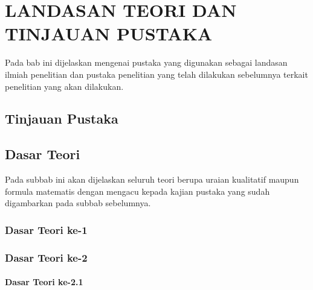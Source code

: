 %
%
%
%
%

\chapter{LANDASAN TEORI DAN TINJAUAN PUSTAKA}
\label{sec:landasan-teori-dan-tinjauan-pustaka}

Pada bab ini dijelaskan mengenai pustaka yang digunakan sebagai landasan ilmiah penelitian dan pustaka penelitian yang telah dilakukan sebelumnya terkait penelitian yang akan dilakukan.

\section{Tinjauan Pustaka}

\blindtext

\section{Dasar Teori}

Pada subbab ini akan dijelaskan seluruh teori berupa uraian kualitatif
maupun formula matematis dengan mengacu kepada kajian pustaka yang sudah digambarkan pada subbab sebelumnya.

\subsection{Dasar Teori ke-1}

\blindtext

\subsection{Dasar Teori ke-2}

\blindtext

\subsubsection{Dasar Teori ke-2.1}

